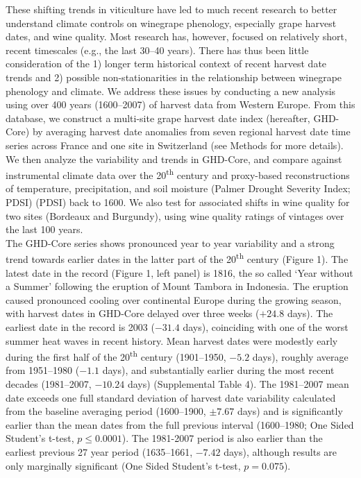 \documentclass[final]{nature}
\begin{document}
\indent These shifting trends in viticulture have led to much recent research to better understand climate controls on winegrape phenology\cite{odo2012,webb2012}, especially grape harvest dates, and wine quality\cite{coombe1987,jones2005,vanlee2009}.  Most research has, however, focused on relatively short, recent timescales (e.g., the last 30--40 years\cite{Duchene:2005bd,tomasi2011,webb2012}). There has thus been little consideration of the 1) longer term historical context of recent harvest date trends and 2) possible non-stationarities in the relationship between winegrape phenology and climate. We address these issues by conducting a new analysis using over 400 years (1600--2007) of harvest data from Western Europe\cite{Daux2012}. From this database, we construct a multi-site grape harvest date index (hereafter, GHD-Core) by averaging harvest date anomalies from seven regional harvest date time series across France and one site in Switzerland (see Methods for more details). We then analyze the variability and trends in GHD-Core, and compare against instrumental climate data over the 20\textsuperscript{th} century\cite{Harris2014} and proxy-based reconstructions of temperature\cite{Luterbacher2004}, precipitation\cite{Pauling2006}, and soil moisture (Palmer Drought Severity Index; PDSI)\cite{CookOWDA2015} (PDSI) back to 1600. We also test for associated shifts in wine quality for two sites (Bordeaux and Burgundy), using wine quality ratings of vintages over the last 100 years\cite{Broadbent2002}.\\
\indent The GHD-Core series shows pronounced year to year variability and a strong trend towards earlier dates in the latter part of the 20\textsuperscript{th} century (Figure 1). The latest date in the record (Figure 1, left panel) is 1816, the so called `Year without a Summer' following the eruption of Mount Tambora in Indonesia\cite{Oppenheimer2003}. The eruption caused pronounced cooling over continental Europe during the growing season, with harvest dates in GHD-Core delayed over three weeks ($+24.8$ days). The earliest date in the record is 2003 ($-31.4$ days), coinciding with one of the worst summer heat waves in recent history\cite{Rebetz2006}. Mean harvest dates were modestly early during the first half of the 20\textsuperscript{th} century (1901--1950, $-5.2$ days), roughly average from 1951--1980 ($-1.1$ days), and substantially earlier during the most recent decades (1981--2007, $-10.24$ days) (Supplemental Table 4). The 1981--2007 mean date exceeds one full standard deviation of harvest date variability calculated from the baseline averaging period (1600--1900, $\pm7.67$ days) and is significantly earlier than the mean dates from the full previous interval (1600--1980; One Sided Student's t-test, $p\le0.0001$). The 1981-2007 period is also earlier than the earliest previous 27 year period (1635--1661, $-7.42$ days), although results are only marginally significant (One Sided Student's t-test, $p=0.075$).\\
\end{document}
